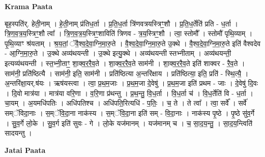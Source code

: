\documentclass[17pt]{extarticle}
\begin{document}
\textbf{Krama Paata} \newline

बृह॒स्पति॑र्. हेती॒नाम् । हे॒ती॒नाम् प्र॑तिध॒र्ता । प्र॒ति॒ध॒र्ता त्रि॑णवत्रयस्त्रिꣳ॒॒शौ । प्र॒ति॒ध॒र्तेति॑ प्रति - ध॒र्ता । त्रि॒ण॒व॒त्र॒य॒स्त्रिꣳ॒॒शौ त्वा᳚ । त्रि॒ण॒व॒त्र॒य॒स्त्रिꣳ॒॒शाविति॑ त्रिणव - त्र॒य॒स्त्रिꣳ॒॒शौ । त्वा॒ स्तोमौ᳚ । स्तोमौ॑ पृथि॒व्याम् । पृ॒थि॒व्याꣳ श्र॑यताम् । श्र॒य॒तां॒ ॅवै॒श्व॒दे॒वा॒ग्नि॒मा॒रु॒ते । वै॒श्व॒दे॒वा॒ग्नि॒मा॒रु॒ते उ॒क्थे । वै॒श्व॒दे॒वा॒ग्नि॒मा॒रु॒ते इति॑ वैश्वदेव - आ॒ग्नि॒मा॒रु॒ते । उ॒क्थे अव्य॑थयन्ती । उ॒क्थे इत्यु॒क्थे । अव्य॑थयन्ती स्तभ्नीताम् । अव्य॑थयन्ती॒ इत्यव्य॑थयन्ती । स्त॒भ्नी॒ताꣳ॒॒ शा॒क्व॒र॒रै॒व॒ते । शा॒क्व॒र॒रै॒व॒ते साम॑नी । शा॒क्व॒र॒रै॒व॒ते इति॑ शाक्वर - रै॒व॒ते । साम॑नी॒ प्रति॑ष्ठित्यै । साम॑नी॒ इति॒ साम॑नी । प्रति॑ष्ठित्या अ॒न्तरि॑क्षाय । प्रति॑ष्ठित्या॒ इति॒ प्रति॑ - स्थि॒त्यै॒ । अ॒न्तरि॑क्षा॒यर्.ष॑यः । ऋष॑यस्त्वा । त्वा॒ प्र॒थ॒म॒जाः । प्र॒थ॒म॒जा दे॒वेषु॑ । प्र॒थ॒म॒जा इति॑ प्रथम - जाः । दे॒वेषु॑ दि॒वः । दि॒वो मात्र॑या । मात्र॑या वरि॒णा । व॒रि॒णा प्र॑थन्तु । प्र॒थ॒न्तु॒ वि॒ध॒र्ता । वि॒ध॒र्ता च॑ । वि॒ध॒र्तेति॑ वि - ध॒र्ता । चा॒यम् । अ॒यमधि॑पतिः । अधि॑पतिश्च । अधि॑पति॒रित्यधि॑ - प॒तिः॒ । च॒ ते । ते त्वा᳚ । त्वा॒ सर्वे᳚ । सर्वे॑ सम्ॅविदा॒नाः । स॒म्ॅवि॒दा॒ना नाक॑स्य । स॒म्ॅवि॒दा॒ना इति॑ सम् - वि॒दा॒नाः । नाक॑स्य पृ॒ष्ठे । पृ॒ष्ठे सु॑व॒र्गे । सु॒व॒र्गे लो॒के । सु॒व॒र्ग इति॑ सुवः - गे । लो॒के यज॑मानम् । यज॑मानम् च । च॒ सा॒द॒य॒न्तु॒ । सा॒द॒य॒न्त्विति॑ सादयन्तु । \newline

\textbf{Jatai Paata} \newline
\end{document}
